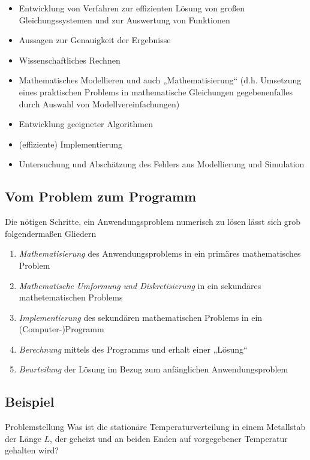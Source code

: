 \documentclass[a4paper]{scrartcl}
\numberwithin{equation}{section}
\begin{document}
\begin{itemize}
\item Entwicklung von Verfahren zur effizienten Lösung von großen Gleichungssystemen
und zur Auswertung von Funktionen
\item Aussagen zur Genauigkeit der Ergebnisse
\item Wissenschaftliches Rechnen
\item Mathematisches Modellieren und auch „Mathematisierung“ 
	(d.h. Umsetzung eines praktischen Problems in mathematische Gleichungen gegebenenfalles durch Auswahl von Modellvereinfachungen)
\item Entwicklung geeigneter Algorithmen
\item (effiziente) Implementierung
\item Untersuchung und Abschätzung des Fehlers aus Modellierung und Simulation
\end{itemize}

\subsection{Vom Problem zum Programm}

Die nötigen Schritte, ein Anwendungsproblem numerisch zu lösen lässt sich grob folgendermaßen Gliedern

\begin{enumerate}
	\item \emph{Mathematisierung} des Anwendungsproblems in ein primäres mathematisches Problem
	\item \emph{Mathematische Umformung und Diskretisierung} in ein sekundäres mathetematischen Problems
	\item \emph{Implementierung} des sekundären mathematischen Problems in ein (Computer-)Programm
	\item \emph{Berechnung} mittels des Programms und erhalt einer „Lösung“
	\item \emph{Beurteilung} der Lösung im Bezug zum anfänglichen Anwendungsproblem
\end{enumerate}

\subsection{Beispiel}

\begin{seg}{Problemstellung}
Was ist die stationäre Temperaturverteilung in einem Metallstab der Länge $L$, der geheizt
und an beiden Enden auf vorgegebener Temperatur gehalten wird?
\end{seg}
\end{document}
